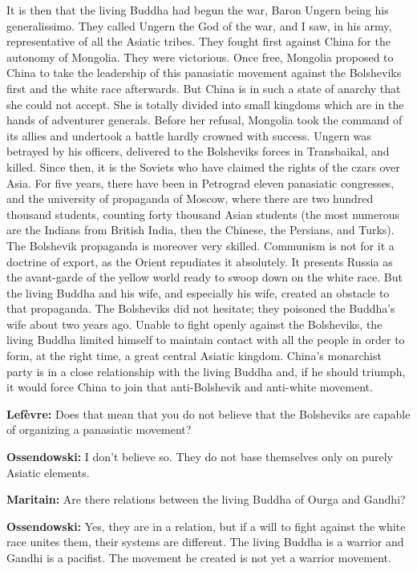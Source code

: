 It is then that the living Buddha had begun the war, Baron Ungern being his generalissimo. They called Ungern the God of the war, and I saw, in his army, representative of all the Asiatic tribes. They fought first against China for the autonomy of Mongolia. They were victorious. Once free, Mongolia proposed to China to take the leadership of this panasiatic movement against the Bolsheviks first and the white race afterwards. But China is in such a state of anarchy that she could not accept. She is totally divided into small kingdoms which are in the hands of adventurer generals. Before her refusal, Mongolia took the command of its allies and undertook a battle hardly crowned with success. Ungern was betrayed by his officers, delivered to the Bolsheviks forces in Transbaikal, and killed. Since then, it is the Soviets who have claimed the rights of the czars over Asia. For five years, there have been in Petrograd eleven panasiatic congresses, and the university of propaganda of Moscow, where there are two hundred thousand students, counting forty thousand Asian students (the most numerous are the Indians from British India, then the Chinese, the Persians, and Turks). The Bolshevik propaganda is moreover very skilled. Communism is not for it a doctrine of export, as the Orient repudiates it absolutely. It presents Russia as the avant-garde of the yellow world ready to swoop down on the white race. But the living Buddha and his wife, and especially his wife, created an obstacle to that propaganda. The Bolsheviks did not hesitate; they poisoned the Buddha's wife about two years ago. Unable to fight openly against the Bolsheviks, the living Buddha limited himself to maintain contact with all the people in order to form, at the right time, a great central Asiatic kingdom. China's monarchist party is in a close relationship with the living Buddha and, if he should triumph, it would force China to join that anti-Bolshevik and anti-white movement.

\textbf{Lefèvre:} Does that mean that you do not believe that the Bolsheviks are capable of organizing a panasiatic movement?

\textbf{Ossendowski:} I don't believe so. They do not base themselves only on purely Asiatic elements.

\textbf{Maritain:} Are there relations between the living Buddha of Ourga and Gandhi?

\textbf{Ossendowski:} Yes, they are in a relation, but if a will to fight against the white race unites them, their systems are different. The living Buddha is a warrior and Gandhi is a pacifist. The movement he created is not yet a warrior movement.

